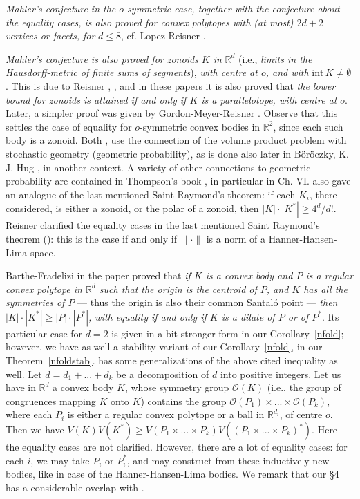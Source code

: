 \documentclass[12pt]{article}
\newcommand{\R}{\mathbb{R}}
\def\cal{\mathcal}
\begin{document}
{\it{Mahler's conjecture in the $o$-symmetric case, 
together with the conjecture about the equality cases, 
is also proved for convex polytopes
with (at most) $2d+2$ vertices or facets, for}} $d \le 8$, cf. Lopez-Reisner 
\cite{LR}.

{\it{Mahler's conjecture is also proved for 
zonoids $K$ in}} ${\mathbb R}^d$ (i.e., {\it{limits in
the Hausdorff-metric of finite sums of segments}}), {\it{with centre at $o$,
and with}} ${\text{int}}\,K \ne \emptyset $. This is due to 
Reisner \cite{R85}, \cite{R86}, and in these papers it is also proved that
{\it{the lower bound for zonoids is attained if and only if $K$ is a
parallelotope, with centre at}} $o$. 
Later, a simpler proof was given by
Gordon-Meyer-Reisner \cite{GMR}. 
Observe that this settles the case of equality for
$o$-symmetric convex bodies in ${\mathbb R}^2$, 
since each such body is a zonoid. Both \cite{R85}, \cite{R86} use the
connection of the volume product problem with stochastic geometry (geometric
probability), as is done
also later in B\"or\"oczky, K. J.-Hug \cite{BH}, in another context. 
A variety
of other connections to geometric probability are contained in Thompson's 
book
\cite{Th96}, in particular in Ch. VI.
\cite{R85} also gave an analogue of the last mentioned
Saint Raymond's theorem: if each $K_i$, there considered,
is either a zonoid, or the polar of a
zonoid, then $|K| \cdot |K^*| \ge 4^d/d!$. Reisner 
\cite{R87} clarified the equality cases in the last mentioned Saint Raymond's
theorem (\cite{SR}): this is the case if and only if 
$\| \cdot \|$ is a norm of a Hanner-Hansen-Lima space.

Barthe-Fradelizi in the paper \cite{BF}
proved that {\it{if $K$
is a convex body and $P$ is a regular convex polytope in $\R^d$ such that
the origin is the centroid of $P$, and $K$ has all the symmetries
of $P$}} --- thus the origin is also their common Santal\'o point ---
{\it{then $|K|\cdot|K^*|\geq |P|\cdot|P^*|$, with equality if and only if 
$K$ is a dilate of $P$ or of $P^*$}}. Its particular case for $d=2$ 
is given in a bit stronger form in our 
Corollary~\ref{nfold}; however, we have as well a stability variant of our
Corollary~\ref{nfold}, in our Theorem~\ref{nfoldstab}.
\cite{BF} has some generalizations of the above cited inequality as well.
Let $d=d_1+...+d_k$ be a decomposition of $d$ into positive integers. Let us
have in ${\mathbb R}^d$ a convex body $K$, whose symmetry group ${\cal
O}(K)$ (i.e., the group of congruences mapping $K$ onto $K$) contains
the group ${\cal O}(P_1) \times ... \times {\cal O}(P_k)$, where each $P_i$ is
either a regular convex polytope or a ball in ${\mathbb R}^{d_i}$, of centre
$o$. Then we have $V(K)V(K^*) \ge V(P_1 \times ... \times P_k)
V \left( (P_1 \times ... \times P_k)^* \right) $. Here the equality
cases are not clarified. However, there are a lot of equality cases: for each
$i$, we may take $P_i$ or $P_i^*$, and may construct
from these inductively new bodies, like in case of the 
Hanner-Hansen-Lima bodies.
We remark that our \S 4 has a considerable overlap with \cite{BF}.
\end{document}
